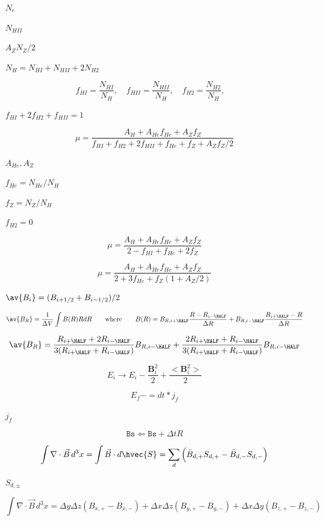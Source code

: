 \documentclass{article}
\begin{document}
$ N_e $
\pagebreak

$ N_{HII} $
\pagebreak

$ A_ZN_Z/2 $
\pagebreak

$ N_H = N_{HI} + N_{HII} + 2N_{H2} $
\pagebreak

\[      f_{HI}  = \frac{N_{HI}}{N_H},\quad
      f_{HII} = \frac{N_{HII}}{N_H},\quad
      f_{H2}  = \frac{N_{H2}}{N_H},\quad
\]
\pagebreak

$ f_{HI} + 2f_{H2} + f_{HII} = 1 $
\pagebreak

\[   \mu = \frac{A_H + A_{He}f_{He} + A_Zf_Z}
              {f_{HI} + f_{H2} + 2f_{HII} + f_{He} + f_Z + A_Z f_Z/2}
\]
\pagebreak

$A_{He}, A_Z $
\pagebreak

$f_{He} = N_{He}/N_H$
\pagebreak

$f_Z = N_Z/N_H$
\pagebreak

$ f_{H2} = 0$
\pagebreak

\[      \mu = \frac{A_H + A_{He}f_{He} + A_Zf_Z}
                 {2 - f_{HI} + f_{He} + 2f_Z}
\]
\pagebreak

\[      \mu = \frac{A_H + A_{He}f_{He} + A_Zf_Z}{2  + 3f_{He} + f_Z(1 + A_Z/2)}
\]
\pagebreak

$ \av{B_i} = (B_{i+1/2} + B_{i-1/2})/2$
\pagebreak

\[  \av{B_R} = \frac{1}{\Delta V} \int B(R) R dR 
   \qquad\mathrm{where}\qquad
    B(R) =   B_{R,i+\HALF} \frac{R - R_{i-\HALF}}{\Delta R} 
           + B_{R,i-\HALF} \frac{R_{i+\HALF} - R}{\Delta R}
\]
\pagebreak

\[  \av{B_R} =  \frac{R_{i+\HALF} + 2R_{i-\HALF}}{3(R_{i+\HALF}+R_{i-\HALF})}
               B_{R,i-\HALF}
            + \frac{2R_{i+\HALF} + R_{i-\HALF}}{3(R_{i+\HALF}+R_{i-\HALF})}
               B_{R,i-\HALF}
\]
\pagebreak

\[  E_i \to E_i - \frac{\mathbf{B}_i^2}{2} + \frac{<\mathbf{B}_i^2>}{2}
\]
\pagebreak

\[    E_f -= dt*j_f   
\]
\pagebreak

$ j_f $
\pagebreak

\[  \mathtt{Bs} \Longleftarrow \mathtt{Bs} + \Delta t R
\]
\pagebreak

\[     \int \nabla\cdot\vec{B}\, d^3x
   = \int \vec{B}\cdot d\hvec{S}
   = \sum_d \Big(\bar{B}_{d,+}S_{d,+} - \bar{B}_{d,-}S_{d,-} \Big)
\]
\pagebreak

$S_{d,\pm}$
\pagebreak

\[     \int \nabla\cdot\vec{B}\, d^3x
   =  \Delta y\Delta z \left(B_{x,+} - B_{x,-}\right)
    + \Delta x\Delta z \left(B_{y,+} - B_{y,-}\right)
    + \Delta x\Delta y \left(B_{z,+} - B_{z,-}\right)
\]
\pagebreak
\end{document}
